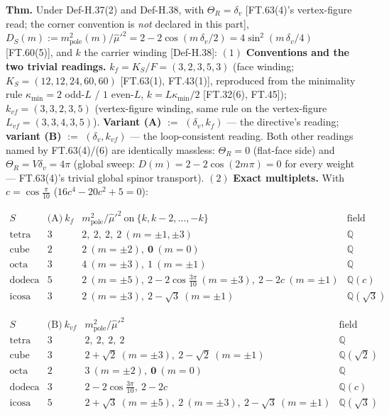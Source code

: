 \begin{theorem}\label{tag:FT-76}
\textbf{Thm.} Under Def-H.37(2) and Def-H.38, with $\Theta_R=\delta_v$ [FT.63(4)'s vertex-figure read; the corner convention is \textit{not} declared in this part], $D_S(m):=m^2_{\mathrm{pole}}(m)/\hat\mu'^2=2-2\cos(m\,\delta_v/2)=4\sin^2(m\,\delta_v/4)$ [FT.60(5)], and $k$ the carrier winding [Def-H.38]: $(1)$ \textbf{Conventions and the two trivial readings.} $k_f=K_S/F=(3,2,3,5,3)$ (face winding; $K_S=(12,12,24,60,60)$ [FT.63(1), FT.43(1)], reproduced from the minimality rule $\kappa_{\min}=2$ odd-$L$ / $1$ even-$L$, $k=L\kappa_{\min}/2$ [FT.32(6), FT.45]); $k_{vf}=(3,3,2,3,5)$ (vertex-figure winding, same rule on the vertex-figure $L_{vf}=(3,3,4,3,5)$). \textbf{Variant (A)} $:=$ $(\delta_v,k_f)$ — the directive's reading; \textbf{variant (B)} $:=$ $(\delta_v,k_{vf})$ — the loop-consistent reading. Both other readings named by FT.63(4)/(6) are identically massless: $\Theta_R=0$ (flat-face side) and $\Theta_R=V\delta_v=4\pi$ (global sweep: $D(m)=2-2\cos(2m\pi)=0$ for every weight — FT.63(4)'s trivial global spinor transport). $(2)$ \textbf{Exact multiplets.} With $c=\cos\tfrac\pi{10}$ ($16c^4-20c^2+5=0$):

\[
\begin{array}{c|c|c|c}
S & \text{(A)}\ k_f & m^2_{\mathrm{pole}}/\hat\mu'^2\ \text{on}\ \{k,k{-}2,\dots,-k\} & \text{field}\\
\hline
\text{tetra} & 3 & 2,\ 2,\ 2,\ 2\ (m=\pm1,\pm3) & \mathbb Q\\
\text{cube} & 2 & 2\ (m=\pm2),\ \mathbf 0\ (m=0) & \mathbb Q\\
\text{octa} & 3 & 4\ (m=\pm3),\ 1\ (m=\pm1) & \mathbb Q\\
\text{dodeca} & 5 & 2\ (m=\pm5),\ 2{-}2\cos\tfrac{3\pi}{10}\ (m=\pm3),\ 2{-}2c\ (m=\pm1) & \mathbb Q(c)\\
\text{icosa} & 3 & 2\ (m=\pm3),\ 2{-}\sqrt3\ (m=\pm1) & \mathbb Q(\sqrt3)
\end{array}
\]

\[
\begin{array}{c|c|c|c}
S & \text{(B)}\ k_{vf} & m^2_{\mathrm{pole}}/\hat\mu'^2 & \text{field}\\
\hline
\text{tetra} & 3 & 2,\ 2,\ 2,\ 2 & \mathbb Q\\
\text{cube} & 3 & 2{+}\sqrt2\ (m=\pm3),\ 2{-}\sqrt2\ (m=\pm1) & \mathbb Q(\sqrt2)\\
\text{octa} & 2 & 3\ (m=\pm2),\ \mathbf 0\ (m=0) & \mathbb Q\\
\text{dodeca} & 3 & 2{-}2\cos\tfrac{3\pi}{10},\ 2{-}2c & \mathbb Q(c)\\
\text{icosa} & 5 & 2{+}\sqrt3\ (m=\pm5),\ 2\ (m=\pm3),\ 2{-}\sqrt3\ (m=\pm1) & \mathbb Q(\sqrt3)
\end{array}
\]


\end{theorem}
